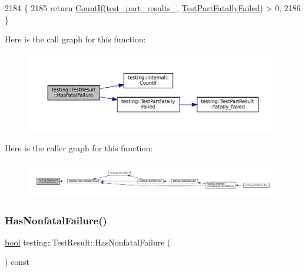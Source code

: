 \begin{DoxyCode}
2184                                        \{
2185   \textcolor{keywordflow}{return} \hyperlink{namespacetesting_1_1internal_a1e77a774d910346eff11a86d8df783a5}{CountIf}(\hyperlink{classtesting_1_1TestResult_af17c00fae1435d344b318eb6bbb56cff}{test\_part\_results\_}, 
      \hyperlink{namespacetesting_a9f19442d566c7eaec0702b9fcf282b63}{TestPartFatallyFailed}) > 0;
2186 \}
\end{DoxyCode}
Here is the call graph for this function\+:
\nopagebreak
\begin{figure}[H]
\begin{center}
\leavevmode
\includegraphics[width=350pt]{classtesting_1_1TestResult_a30e00d4076ae07fb5ad7b623d9dc1fe4_cgraph}
\end{center}
\end{figure}
Here is the caller graph for this function\+:
\nopagebreak
\begin{figure}[H]
\begin{center}
\leavevmode
\includegraphics[width=350pt]{classtesting_1_1TestResult_a30e00d4076ae07fb5ad7b623d9dc1fe4_icgraph}
\end{center}
\end{figure}
\mbox{\label{classtesting_1_1TestResult_a510564fa67b485ed4589a259f2a032d6}} 
\subsubsection{\texorpdfstring{Has\+Nonfatal\+Failure()}{HasNonfatalFailure()}}
{\footnotesize\ttfamily \hyperlink{classbool}{bool} testing\+::\+Test\+Result\+::\+Has\+Nonfatal\+Failure (\begin{DoxyParamCaption}{ }\end{DoxyParamCaption}) const}



